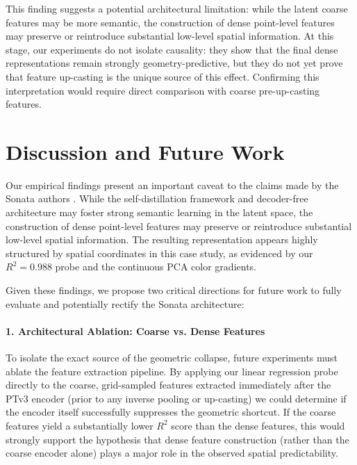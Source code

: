 \documentclass[11pt, a4paper]{article}
\begin{document}
This finding suggests a potential architectural limitation: while the latent coarse features may be more semantic, the construction of dense point-level features may preserve or reintroduce substantial low-level spatial information. At this stage, our experiments do not isolate causality: they show that the final dense representations remain strongly geometry-predictive, but they do not yet prove that feature up-casting is the unique source of this effect. Confirming this interpretation would require direct comparison with coarse pre-up-casting features.

\newpage
\section{Discussion and Future Work}

Our empirical findings present an important caveat to the claims made by the Sonata authors \cite{sonata2025}. While the self-distillation framework and decoder-free architecture may foster strong semantic learning in the latent space, the construction of dense point-level features may preserve or reintroduce substantial low-level spatial information. The resulting representation appears highly structured by spatial coordinates in this case study, as evidenced by our $R^2 = 0.988$ probe and the continuous PCA color gradients.

Given these findings, we propose two critical directions for future work to fully evaluate and potentially rectify the Sonata architecture:

\paragraph{1. Architectural Ablation: Coarse vs. Dense Features}
To isolate the exact source of the geometric collapse, future experiments must ablate the feature extraction pipeline. By applying our linear regression probe directly to the coarse, grid-sampled features extracted immediately after the PTv3 \cite{ptv3} encoder (prior to any inverse pooling or up-casting) we could determine if the encoder itself successfully suppresses the geometric shortcut. If the coarse features yield a substantially lower $R^2$ score than the dense features, this would strongly support the hypothesis that dense feature construction (rather than the coarse encoder alone) plays a major role in the observed spatial predictability.
\end{document}
